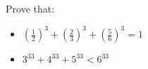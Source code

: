 Prove that:
\begin{itemize}
	\item $\displaystyle\left(  \frac{1}{2}\right)  ^{3}+\left(  \frac{2}{3}\right)^{3}+\left(  \frac{5}{6}\right)  ^{3}=1$
	\item $3^{33}+4^{33}+5^{33}<6^{33}$
\end{itemize}
